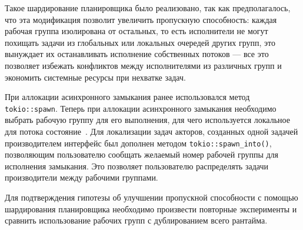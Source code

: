 Такое шардирование планировщика было реализовано, так как предполагалось, что эта модификация позволит увеличить пропускную способность: каждая рабочая группа изолирована от остальных, то есть исполнители не могут похищать задачи из глобальных или локальных очередей других групп, это вынуждает их останавливать исполнение собственных потоков --- все это позволяет избежать конфликтов между исполнителями из различных групп и экономить системные ресурсы при нехватке задач.

При аллокации асинхронного замыкания ранее использовался метод \verb|tokio::spawn|. Теперь при аллокации асинхронного замыкания необходимо выбрать рабочую группу для его выполнения, для чего используется локальное для потока состояние~\cite{xorshiftRNG}. Для локализации задач акторов, созданных одной задачей производителем интерфейс был дополнен методом \verb|tokio::spawn_into()|, позволяющим пользователю сообщать желаемый номер рабочей группы для исполнения замыкания. Это позволяет пользователю распределять задачи производители между рабочими группами.

Для подтверждения гипотезы об улучшении пропускной способности с помощью шардирования планировщика необходимо произвести повторные эксперименты и сравнить использование рабочих групп с дублированием всего рантайма.
